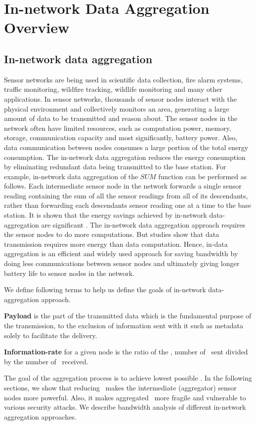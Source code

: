\chapter{In-network Data Aggregation Overview} %
\label{cha:In-network Data-Aggregation Overview}

\section{In-network data aggregation}
	Sensor networks are being used in scientific data collection, fire alarm systems, traffic monitoring, wildfire tracking, wildlife monitoring and many other applications.
	In sensor networks, thousands of sensor nodes interact with the physical environment and collectively monitors an area, generating a large amount of data to be transmitted and reason about.
	The sensor nodes in the network often have limited resources, such as computation power, memory, storage, communication capacity and most significantly, battery power.
	Also, data communication between nodes consumes a large portion of the total energy consumption. 
	The in-network data aggregation reduces the energy consumption by eliminating redundant data being transmitted to the base station.
	For example, in-network data aggregation of the $\textit{SUM}$ function can be performed as follows. 
	Each intermediate sensor node in the network forwards a single sensor reading containing the sum of all the sensor readings from all of its descendants, rather than forwarding each descendants sensor reading one at a time to the base station.
	It is shown that the energy savings achieved by in-network data-aggregation are significant \cite{madden2002tag}.
	The in-network data aggregation approach requires the sensor nodes to do more computations.
	But studies show that data transmission requires more energy than data computation. 
	Hence, in-data aggregation is an efficient and widely used approach for saving bandwidth by doing less communications between sensor nodes and ultimately giving longer battery life to sensor nodes in the network.

	We define following terms to help us define the goals of in-network data-aggregation approach.
	\begin{definition}\label{def:payload}
		\textbf{Payload} is the part of the transmitted data which is the fundamental purpose of the transmission, to the exclusion of information sent with it such as metadata solely to facilitate the delivery.
	\end{definition}
	\begin{definition}\label{def:information-rate}
		\textbf{Information-rate} for a given node is the ratio of the \payloads, number of \payloads\ sent divided by the number of \payloads\ received.
	\end{definition}
	The goal of the aggregation process is to achieve lowest possible \informationRate.
	In the following sections, we show that reducing \informationRate\ makes the intermediate (aggregator) sensor nodes more powerful.
	Also, it makes aggregated \payload\ more fragile and vulnerable to various security attacks.
	We describe bandwidth analysis of different in-network aggregation approaches.


